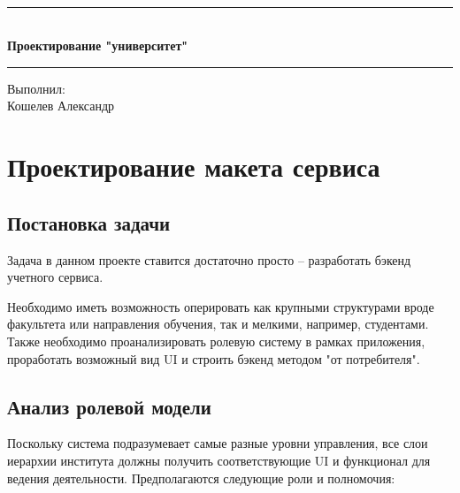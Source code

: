 \documentclass[12pt,a4paperб]{article}
\begin{document}
	
		\begin{titlepage}
		\vspace*{\fill}
		
		\begin{center}
			
			\\[0.5cm]\noindent\rule{\textwidth}{1pt}
			\\\Huge\textbf{Проектирование "университет"}
			\\[-0.5cm]\noindent\rule{\textwidth}{1pt}
		\end{center}
		
		\vspace*{\fill}
		
		\begin{flushleft}
			Выполнил: \hspace{\fill}
			\\Кошелев Александр \hspace{\fill}
		\end{flushleft}
	\end{titlepage}
	
	\tableofcontents
	
	\setcounter{page}{2}
	\newpage
	
	\section{Проектирование макета сервиса}
	
	\subsection{Постановка задачи}
	
	Задача в данном проекте ставится достаточно просто -- разработать бэкенд учетного сервиса.
	
	Необходимо иметь возможность оперировать как крупными структурами вроде факультета или направления обучения, так и мелкими, например, студентами. Также необходимо проанализировать ролевую систему в рамках приложения, проработать возможный вид UI и строить бэкенд методом "от потребителя".
	
	\subsection{Анализ ролевой модели}
	
	Поскольку система подразумевает самые разные уровни управления, все слои иерархии института должны получить соответствующие UI и функционал для ведения деятельности. Предполагаются следующие роли и полномочия:
	
\end{document}
